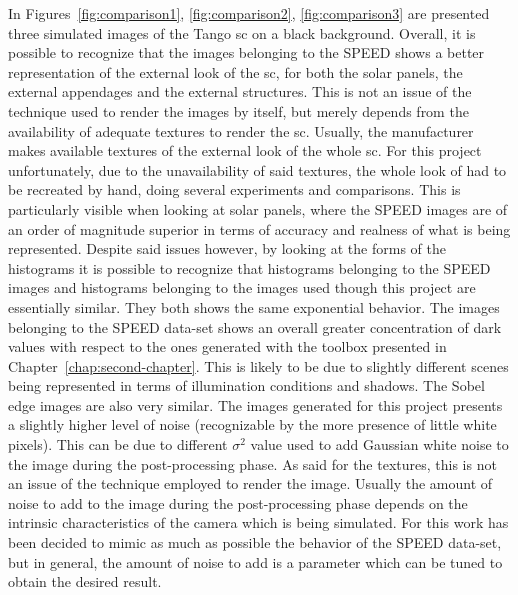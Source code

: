 In Figures~\ref{fig:comparison1}, \ref{fig:comparison2}, \ref{fig:comparison3} are presented three simulated images of the Tango \acrshort{sc} on a black background.
Overall, it is possible to recognize that the images belonging to the SPEED shows a better representation of the external look of the \acrshort{sc}, for both the solar panels, the external appendages and the external structures. This is not an issue of the technique used to render the images by itself, but merely depends from the availability of adequate textures to render the \acrshort{sc}. Usually, the manufacturer makes available textures of the external look of the whole \acrshort{sc}. For this project unfortunately, due to the unavailability of said textures, the whole look of had to be recreated by hand, doing several experiments and comparisons. This is particularly visible when looking at solar panels, where the SPEED images are of an order of magnitude superior in terms of accuracy and realness of what is being represented.
Despite said issues however, by looking at the forms of the histograms it is possible to recognize that histograms belonging to the SPEED images and histograms belonging to the images used though this project are essentially similar. They both shows the same exponential behavior. The images belonging to the SPEED data-set shows an overall greater concentration of dark values with respect to the ones generated with the toolbox presented in Chapter~\ref{chap:second-chapter}. This is likely to be due to slightly different scenes being represented in terms of illumination conditions and shadows.
The Sobel edge images are also very similar. The images generated for this project presents a slightly higher level of noise (recognizable by the more presence of little white pixels). This can be due to different $\sigma^2$ value used to add Gaussian white noise to the image during the post-processing phase. As said for the textures, this is not an issue of the technique employed to render the image. Usually the amount of noise to add to the image during the post-processing phase depends on the intrinsic characteristics of the camera which is being simulated. For this work has been decided to mimic as much as possible the behavior of the SPEED data-set, but in general, the amount of noise to add is a parameter which can be tuned to obtain the desired result.
